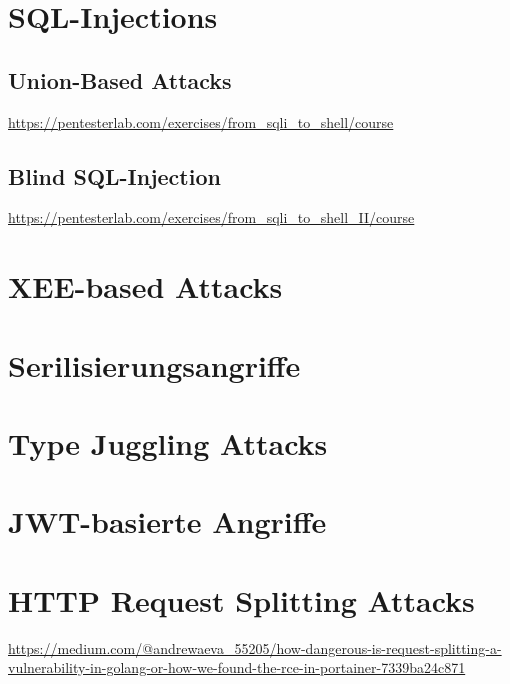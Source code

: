 \chapter{SQL-Injections}

\section{Union-Based Attacks}

\url{https://pentesterlab.com/exercises/from_sqli_to_shell/course}

\section{Blind SQL-Injection}

\url{https://pentesterlab.com/exercises/from_sqli_to_shell_II/course}

\chapter{XEE-based Attacks}

\chapter{Serilisierungsangriffe}

\chapter{Type Juggling Attacks}

\chapter{JWT-basierte Angriffe}

\chapter{HTTP Request Splitting Attacks}

\url{https://medium.com/@andrewaeva_55205/how-dangerous-is-request-splitting-a-vulnerability-in-golang-or-how-we-found-the-rce-in-portainer-7339ba24c871}
